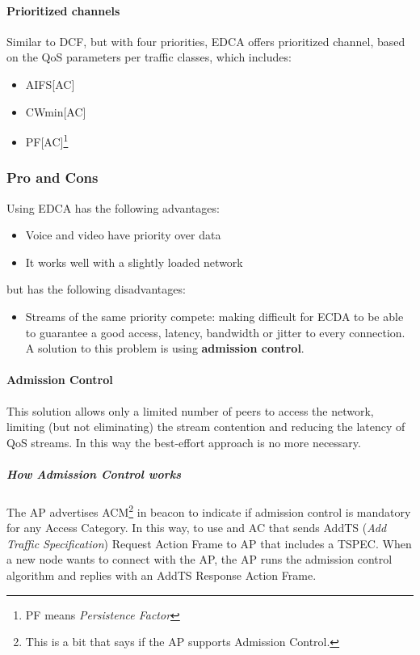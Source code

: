 \paragraph*{Prioritized channels} Similar to DCF, but with four priorities, EDCA
offers prioritized channel, based on the QoS parameters per traffic classes,
which includes:
\begin{itemize}
\item AIFS[AC]
\item CWmin[AC]
\item PF[AC]\footnote{PF means \textit{Persistence Factor}}
\end{itemize}

\subsubsection{Pro and Cons}

Using EDCA has the following advantages:
\begin{itemize}
\item Voice and video have priority over data
\item It works well with a slightly loaded network
\end{itemize}
but has the following disadvantages:
\begin{itemize}
\item Streams of the same priority compete: making difficult for ECDA to be able
  to guarantee a good access, latency, bandwidth or jitter to every connection.
A solution to this problem is using \textbf{admission control}.
\end{itemize}

\paragraph*{Admission Control} This solution allows only a limited number of
peers to access the network, limiting (but not eliminating) the stream
contention and reducing the latency of QoS streams.
In this way the best-effort approach is no more necessary.
\subparagraph*{How Admission Control works} The AP advertises ACM\footnote{This
is a bit that says if the AP supports Admission Control.} in beacon to indicate
if admission control is mandatory for any Access Category. In this way, to use
and AC that  sends AddTS (\textit{Add Traffic Specification}) Request Action
Frame to AP that includes a TSPEC.
When a new node wants to connect with the AP, the AP runs the admission control
algorithm and replies with an AddTS Response Action Frame.

